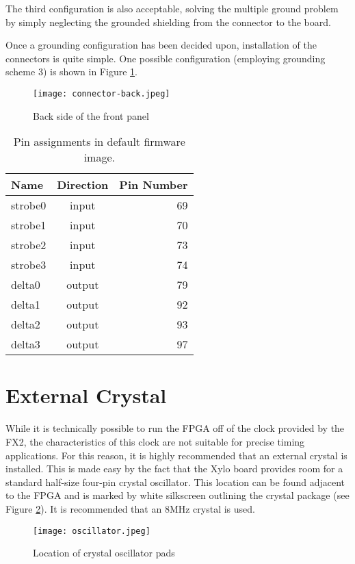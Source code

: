 The third configuration is also acceptable, solving the multiple
ground problem by simply neglecting the grounded shielding from the
connector to the board.

Once a grounding configuration has been decided upon, installation of
the connectors is quite simple. One possible configuration (employing
grounding scheme 3) is shown in Figure \ref{fig:front-panel-rear}.

\begin{figure}
  \center
  \texttt{[image: connector-back.jpeg]}
  \caption{Back side of the front panel}
  \label{fig:front-panel-rear}
\end{figure}

\begin{table}
  \center
  \begin{tabular}{|lcr|}
    \hline
    Name    & Direction & Pin Number \\
    \hline
    strobe0 & input  & 69 \\
    strobe1 & input  & 70 \\
    strobe2 & input  & 73 \\
    strobe3 & input  & 74 \\
    \hline
    delta0  & output & 79 \\
    delta1  & output & 92 \\
    delta2  & output & 93 \\
    delta3  & output & 97 \\
    \hline
  \end{tabular}
  \caption{Pin assignments in default firmware image.}
  \label{table:pins}
\end{table}


\section{External Crystal}

While it is technically possible to run the FPGA off of the clock
provided by the FX2, the characteristics of this clock are not
suitable for precise timing applications. For this reason, it is
highly recommended that an external crystal is installed. This is made
easy by the fact that the Xylo board provides room for a standard
half-size four-pin crystal oscillator. This location can be found
adjacent to the FPGA and is marked by white silkscreen outlining the
crystal package (see Figure \ref{fig:crystal}). It is recommended that
an 8MHz crystal is used.

\begin{figure}
  \center
  \texttt{[image: oscillator.jpeg]}
  \caption{Location of crystal oscillator pads}
  \label{fig:crystal}
\end{figure}

